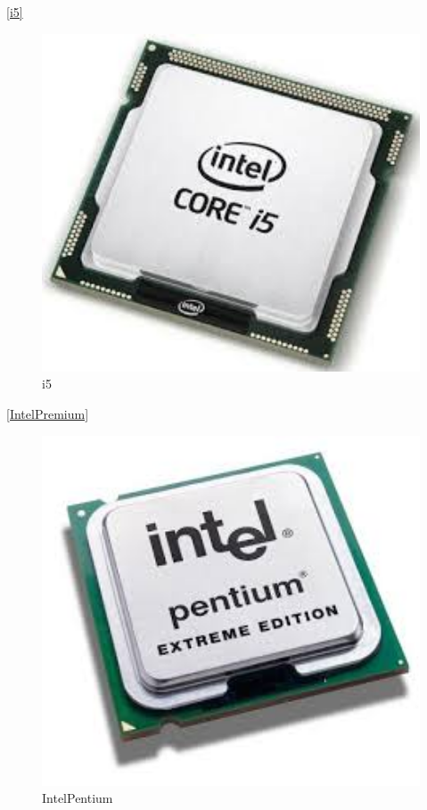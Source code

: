 \ref{i5}
\begin{figure}[ht]
\centerline{\includegraphics[width=1\textwidth]{figures/i5.jpg}}
\caption{i5}
\label{IntelCore5}
\end{figure}

\ref{IntelPremium}
\begin{figure}[ht]
\centerline{\includegraphics[width=1\textwidth]{figures/IntelPentium.jpg}}
\caption{IntelPentium}
\label{IntelPentium}
\end{figure}

